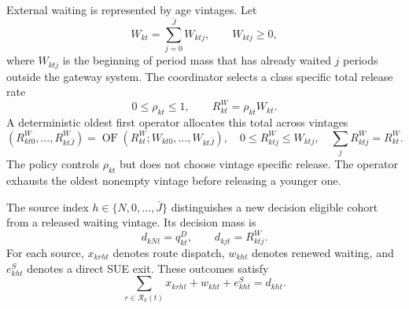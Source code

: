 \documentclass[a4paper,fleqn]{cas-sc}
\begin{document}
External waiting is represented by age vintages. Let
\begin{equation}
 W_{kt}=\sum_{j=0}^{\bar J}W_{ktj},\qquad
 W_{ktj}\ge0,
 \label{eq:waiting-vintages}
\end{equation}
where $W_{ktj}$ is the beginning of period mass that has already waited $j$
periods outside the gateway system. The coordinator selects a class specific
total release rate
\begin{equation}
 0\le\rho_{kt}\le1,\qquad
 R^W_{kt}=\rho_{kt}W_{kt}.
 \label{eq:waiting-release}
\end{equation}
A deterministic oldest first operator allocates this total across vintages
\begin{equation}
 \left(R^W_{kt0},\ldots,R^W_{kt\bar J}\right)
 =
 \operatorname{OF}\!\left(
 R^W_{kt};W_{kt0},\ldots,W_{kt\bar J}
 \right),
 \quad
 0\le R^W_{ktj}\le W_{ktj},\quad
 \sum_jR^W_{ktj}=R^W_{kt}.
 \label{eq:oldest-first}
\end{equation}
The policy controls $\rho_{kt}$ but does not choose vintage specific release.
The operator exhausts the oldest nonempty vintage before releasing a younger
one.

The source index $h\in\{N,0,\ldots,\bar J\}$ distinguishes a new decision
eligible cohort from a released waiting vintage. Its decision mass is
\begin{equation}
 d_{kNt}=q^D_{kt},\qquad d_{kjt}=R^W_{ktj}.
 \label{eq:decision-masses}
\end{equation}
For each source, $x_{krht}$ denotes route dispatch, $w_{kht}$ denotes renewed
waiting, and $e^S_{kht}$ denotes a direct SUE exit. These outcomes satisfy
\begin{equation}
 \sum_{r\in\mathcal R_k(t)}x_{krht}
 +w_{kht}+e^S_{kht}=d_{kht}.
 \label{eq:source-conservation}
\end{equation}
\end{document}
